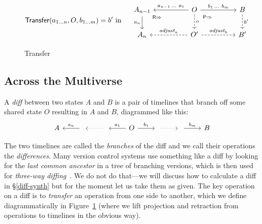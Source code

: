 \documentclass[english,submission]{programming}
\theoremstyle{definition}
\newcommand{\mathbox}[1]{\colorbox{black!10}{$#1$\phantom{i\hspace{-3.5pt}}}}
\begin{document}
\begin{figure}[]
  \vspace{-20pt}
\[
\textsf{Transfer}(a_{1\ldots n}, O, b_{1\ldots m}) = b' \textrm{ in }\quad
\begin{tikzcd}[column sep = huge]
	A_{n-1} & O & B \\
	A_n & {O'} & {B'}
	\arrow["{a_n}"', from=1-1, to=2-1]
	\arrow["{\textsf{R}\Rightarrow}"{description, pos=0.1}, draw=none, from=1-1, to=2-2]
	\arrow["{a_{n-1}\,\ldots\  a_1}"', from=1-2, to=1-1]
	\arrow["{b_1\,\ldots \  b_m}", from=1-2, to=1-3]
	\arrow["o", dashed, from=1-2, to=2-2]
	\arrow["{\textsf{P}\Rightarrow}"{description, pos=0.2}, draw=none, from=1-2, to=2-3]
	\arrow["{b'}", dashed, from=1-3, to=2-3]
	\arrow["{\mathit{adjust}_a}"', dashed, from=2-2, to=2-1]
	\arrow["{\mathit{adjust}_b}", dashed, from=2-2, to=2-3]
\end{tikzcd}\]
\vspace{-16pt}
\caption{Transfer}
\label{fig:transfer}
\end{figure}


\subsection{Across the Multiverse}\label{transfer}

  A \textit{diff} between two states \mathbox{A} and \mathbox{B} is a pair of timelines that branch off some shared state \mathbox{O} resulting in \mathbox{A} and \mathbox{B}, diagrammed like this:
\[\begin{tikzcd}
	A & {} & {} & O & {} & {} & B
	\arrow["{{a_n}}"', from=1-2, to=1-1]
	\arrow[dotted, from=1-3, to=1-2]
	\arrow["{{a_1}}"', from=1-4, to=1-3]
	\arrow["{b_1}", from=1-4, to=1-5]
	\arrow[dotted, from=1-5, to=1-6]
	\arrow["{b_m}", from=1-6, to=1-7]
\end{tikzcd}\]

The two timelines are called the \textit{branches} of the diff and we call their operations the \textit{differences}. Many version control systems use something like a diff by looking for the \textit{last common ancestor} in a tree of branching versions, which is then used for \textit{three-way diffing}~\cite{diff3}. We do not do that---we will discuss how to calculate a diff in \S\ref{diff-synth} but for the moment let us take them as given. The key operation on a diff is to
\textit{transfer} an operation from one side to another, which we define diagrammatically in Figure~\ref{fig:transfer} (where we lift projection and retraction from operations to timelines in the obvious way).
\end{document}
